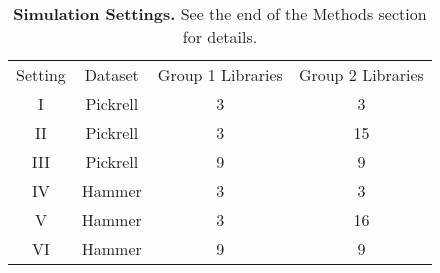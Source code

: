 \documentclass[10pt]{article}
\begin{document}
\begin{table}[!ht] %
   \centering
   \caption{{\bf Simulation Settings.} See the end of the Methods section for details.}
\begin{tabular}{|c|c|c|c|}
Setting & Dataset & Group 1 Libraries & Group 2 Libraries \\
I & Pickrell & 3 & 3 \\
II & Pickrell & 3 & 15 \\
III & Pickrell & 9 & 9 \\
IV & Hammer & 3 & 3 \\
V & Hammer & 3 & 16 \\
VI & Hammer & 9 & 9 \\
\end{tabular}
   \label{tab:simset}
\end{table}
\end{document}
